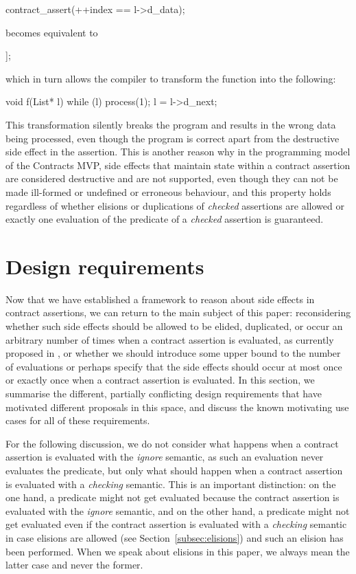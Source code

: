\begin{codeblock}
contract_assert(++index == l->d_data);
\end{codeblock}
becomes equivalent to
\begin{codeblock}
[[assume(l->d_data == 1)]];
\end{codeblock}
which in turn allows the compiler to transform the function  into the following:
\begin{codeblock}
void f(List* l) {
  while (l) {
    process(1);
    l = l->d_next;
  }
}
\end{codeblock}
This transformation silently breaks the program and results in the wrong data being processed, even though the program is correct apart from the destructive side effect in the assertion. This is another reason why in the programming model of the Contracts MVP, side effects that maintain state within a contract assertion are considered destructive and are not supported, even though they can not be made ill-formed or undefined or erroneous behaviour, and this property holds regardless of whether elisions or duplications of \emph{checked} assertions are allowed or exactly one evaluation of the predicate of a \emph{checked} assertion is guaranteed.


\section{Design requirements}
\label{sec:reqs}

Now that we have established a framework to reason about side effects in contract assertions, we can return to the main subject of this paper: reconsidering whether such side effects should be allowed to be elided, duplicated, or occur an arbitrary number of times when a contract assertion is evaluated, as currently proposed in \cite{P2900R6}, or whether we should introduce some upper bound to the number of evaluations or perhaps specify that the side effects should occur at most once or exactly once when a contract assertion is evaluated. In this section, we summarise the different, partially conflicting design requirements that have motivated different proposals in this space, and discuss the known motivating use cases for all of these requirements.

For the following discussion, we do not consider what happens when a contract assertion is evaluated with the \emph{ignore} semantic, as such an evaluation never evaluates the predicate, but only what should happen when a contract assertion is evaluated with a \emph{checking} semantic. This is an important distinction: on the one hand, a predicate might not get evaluated because the contract assertion is evaluated with the \emph{ignore} semantic, and on the other hand, a predicate might not get evaluated even if the contract assertion is evaluated with a \emph{checking} semantic in case elisions are allowed (see Section~\ref{subsec:elisions}) and such an elision has been performed. When we speak about elisions in this paper, we always mean the latter case and never the former.


